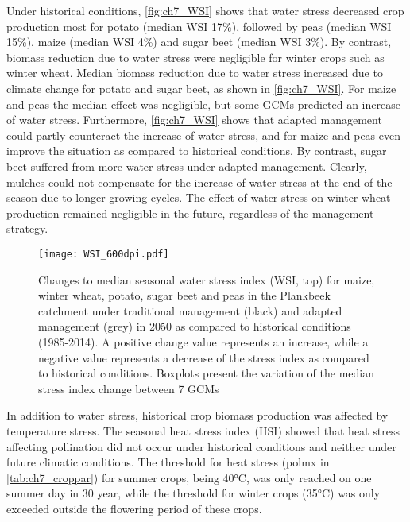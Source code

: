 Under historical conditions, \autoref{fig:ch7_WSI}  shows that water stress decreased crop production most for potato (median WSI 17\%), followed by peas (median WSI 15\%), maize (median WSI 4\%) and sugar beet (median WSI 3\%). By contrast, biomass reduction due to water stress were negligible for winter crops such as winter wheat. Median biomass reduction due to water stress increased due to climate change for potato and sugar beet, as shown in \autoref{fig:ch7_WSI}. For maize and peas the median effect was negligible, but some GCMs predicted an increase of water stress. Furthermore, \autoref{fig:ch7_WSI} shows that adapted management could partly counteract the increase of water-stress, and for maize and peas even improve the situation as compared to historical conditions. By contrast, sugar beet suffered from more water stress  under adapted management. Clearly, mulches could not compensate for the increase of water stress at the end of the season due to longer growing cycles. The effect of water stress on winter wheat production remained negligible in the future, regardless of the management strategy.

\begin{figure}[tbhp]
	\centering
		\texttt{[image: WSI\_600dpi.pdf]}
	\caption{Changes to median seasonal water stress index (WSI, top) for maize, winter wheat, potato, sugar beet and peas in the Plankbeek catchment under traditional management (black) and adapted management (grey) in 2050 as compared to historical conditions (1985-2014). A positive change value represents an increase, while a negative value represents a decrease of the stress index as compared to historical conditions. Boxplots present the variation of the median stress index change between 7 GCMs}
	\label{fig:ch7_WSI}
\end{figure}   

In addition to water stress, historical crop biomass production was affected by temperature stress.
The seasonal heat stress index (HSI) showed that heat stress affecting pollination did not occur under historical conditions and neither under future climatic conditions. The threshold for heat stress (polmx in \autoref{tab:ch7_croppar}) for summer crops, being 40°C, was only reached on one summer day in 30 year, while the threshold for winter crops (35°C) was only exceeded outside the flowering period of these crops.

